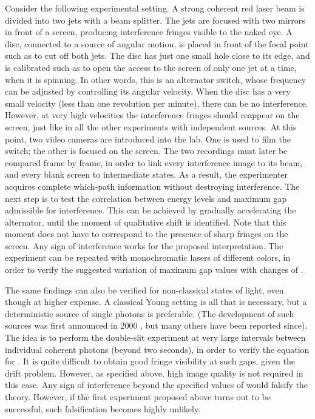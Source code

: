 \documentclass[a4paper,aps,prl,twocolumn,showpacs]{revtex4}
\begin{document}
Consider the following experimental setting. A strong coherent red
laser beam is divided into two jets with a beam splitter. The jets
are focused with two mirrors in front of a screen, producing
interference fringes visible to the naked eye. A disc, connected
to a source of angular motion, is placed in front of the focal
point such as to cut off both jets. The disc has just one small
hole close to its edge, and is calibrated such as to open the
access to the screen of only one jet at a time, when it is
spinning. In other words, this is an alternator switch, whose
frequency can be adjusted by controlling its angular velocity.
When the disc has a very small velocity (less than one revolution
per minute), there can be no interference. However, at very high
velocities the interference fringes should reappear on the screen,
just like in all the other experiments with independent sources.
At this point, two video cameras are introduced into the lab. One
is used to film the switch; the other is focused on the screen.
The two recordings must later be compared frame by frame, in order
to link every interference image to its beam, and every blank
screen to intermediate states. As a result, the experimenter
acquires complete which-path information without destroying
interference. The next step is to test the correlation between
energy levels and maximum gap admissible for interference. This
can be achieved by gradually accelerating the alternator, until
the moment of qualitative shift is identified. Note that this
moment does not have to correspond to the presence of sharp
fringes on the screen. Any sign of interference works for the
proposed interpretation. The experiment can be repeated with
monochromatic lasers of different colors, in order to verify the
suggested variation of maximum gap values with changes of \myHighlight{$\nu$}\coordHE{}.

The same findings can also be verified for non-classical states of
light, even though at higher expense. A classical Young setting is
all that is necessary, but a deterministic source of single
photons is preferable. (The development of such sources was first
announced in 2000 \cite{mich,sant,loun}, but many others have been
reported since). The idea is to perform the double-slit experiment
at very large intervals between individual coherent photons
(beyond two seconds), in order to verify the equation for \coordHE{}. It
is quite difficult to obtain good fringe visibility at such gaps,
given the drift problem. However, as specified above, high image
quality is not required in this case. Any sign of interference
beyond the specified values of \coordHE{} would falsify the theory.
However, if the first experiment proposed above turns out to be
successful, such falsification becomes highly unlikely.
\end{document}
